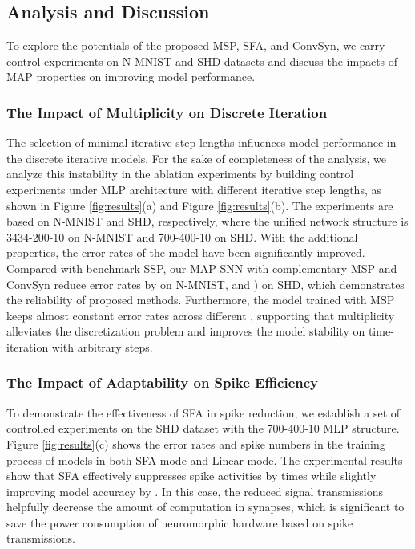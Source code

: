 \documentclass{article}
\begin{document}
\subsection{Analysis and Discussion}
To explore  the potentials of the proposed MSP, SFA, and ConvSyn, we carry control experiments on N-MNIST and SHD datasets and discuss the impacts of MAP properties on improving model performance.







\subsubsection{The Impact of Multiplicity on Discrete Iteration}
The selection of minimal iterative step lengths  influences model performance in the discrete iterative models. For the sake of completeness of the analysis, we analyze this instability in the ablation experiments by building control experiments under MLP architecture with different iterative step lengths, as shown in Figure \ref{fig:results}(a) and Figure \ref{fig:results}(b). The experiments are based on N-MNIST and SHD, respectively, where the unified network structure is 3434-200-10 on N-MNIST and 700-400-10 on SHD. 
With the additional properties, the error rates of the model have been significantly improved. Compared with benchmark SSP, our MAP-SNN with complementary MSP and ConvSyn reduce error rates by  on N-MNIST, and ) on SHD, which demonstrates the reliability of proposed methods. Furthermore, the model trained with MSP keeps almost constant error rates across different , supporting that multiplicity alleviates the discretization problem and improves the model stability on time-iteration with arbitrary steps.



\subsubsection{The Impact of Adaptability on Spike Efficiency }
To demonstrate the effectiveness of SFA in spike reduction, we establish a set of controlled experiments on the SHD dataset with the 700-400-10 MLP structure. Figure \ref{fig:results}(c) shows the error rates and spike numbers in the training process of models in both SFA mode and Linear mode. The experimental results show that SFA effectively suppresses spike activities by  times while slightly improving model accuracy by . In this case, the reduced signal transmissions helpfully decrease the amount of computation in synapses, which is significant to save the power consumption of neuromorphic hardware based on spike transmissions.
\end{document}
